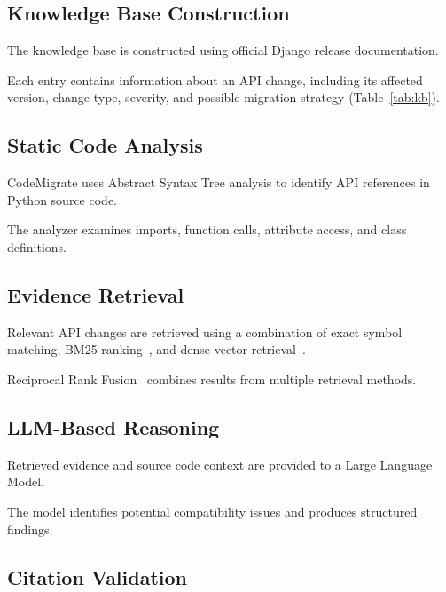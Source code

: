 \documentclass[conference]{IEEEtran}
\begin{document}
\subsection{Knowledge Base Construction}

The knowledge base is constructed using official
Django release documentation.

Each entry contains information about an API change,
including its affected version, change type,
severity, and possible migration strategy (Table~\ref{tab:kb}).



\subsection{Static Code Analysis}

CodeMigrate uses Abstract Syntax Tree analysis
to identify API references in Python source code.

The analyzer examines imports, function calls,
attribute access, and class definitions.

\subsection{Evidence Retrieval}

Relevant API changes are retrieved using a
combination of exact symbol matching,
BM25 ranking~\cite{robertson2009bm25}, and dense vector
retrieval~\cite{reimers2019sbert,johnson2019faiss}.

Reciprocal Rank Fusion~\cite{cormack2009rrf} combines results from
multiple retrieval methods.

\subsection{LLM-Based Reasoning}

Retrieved evidence and source code context are
provided to a Large Language Model.

The model identifies potential compatibility issues
and produces structured findings.

\subsection{Citation Validation}

\end{document}
